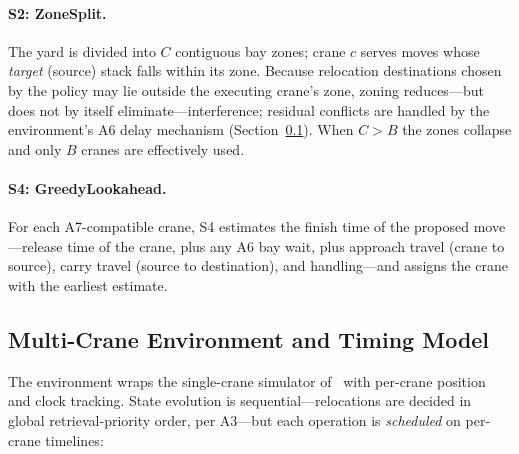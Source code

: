 \documentclass[11pt,a4paper]{elsarticle}
\begin{document}
\paragraph{S2: ZoneSplit.} The yard is divided into $C$ contiguous bay zones; crane $c$ serves moves whose \emph{target} (source) stack falls within its zone. Because relocation destinations chosen by the policy may lie outside the executing crane's zone, zoning reduces---but does not by itself eliminate---interference; residual conflicts are handled by the environment's A6 delay mechanism (Section~\ref{sec:mcenv}). When $C > B$ the zones collapse and only $B$ cranes are effectively used.

\paragraph{S4: GreedyLookahead.} For each A7-compatible crane, S4 estimates the finish time of the proposed move---release time of the crane, plus any A6 bay wait, plus approach travel (crane to source), carry travel (source to destination), and handling---and assigns the crane with the earliest estimate.

\subsection{Multi-Crane Environment and Timing Model}
\label{sec:mcenv}

The environment wraps the single-crane simulator of~\cite{shin2026} with per-crane position and clock tracking. State evolution is sequential---relocations are decided in global retrieval-priority order, per A3---but each operation is \emph{scheduled} on per-crane timelines:
\end{document}
